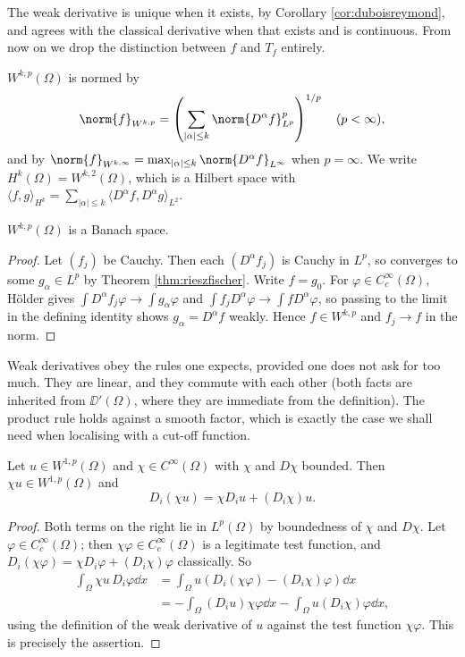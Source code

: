 \documentclass[a4paper]{scrartcl}
\newcommand{\ip}[2]{\langle #1, #2 \rangle}
\begin{document}
The weak derivative is unique when it exists, by Corollary \ref{cor:duboisreymond}, and agrees with the classical derivative when that exists and is continuous. From now on we drop the distinction between $f$ and $T_f$ entirely.

\begin{definition}
	$W^{k,p}(\Omega)$ is normed by
	$$\norm{f}_{W^{k,p}}=\left(\sum_{|\alpha|\le k}\norm{D^\alpha f}_{L^p}^p\right)^{1/p} \quad (p<\infty),$$
	and by $\norm{f}_{W^{k,\infty}}=\max_{|\alpha|\le k}\norm{D^\alpha f}_{L^\infty}$ when $p = \infty$.
	We write $H^k(\Omega)=W^{k,2}(\Omega)$, which is a Hilbert space with $\ip{f}{g}_{H^k}=\sum_{|\alpha|\le k}\ip{D^\alpha f}{D^\alpha g}_{L^2}$.
\end{definition}

\begin{proposition}
	$W^{k,p}(\Omega)$ is a Banach space.
\end{proposition}

\begin{proof}
	Let $(f_j)$ be Cauchy. Then each $(D^\alpha f_j)$ is Cauchy in $L^p$, so converges to some $g_\alpha \in L^p$ by Theorem \ref{thm:rieszfischer}. Write $f = g_0$. For $\varphi\in C_c^\infty(\Omega)$, H\"older gives $\int D^\alpha f_j\varphi\to\int g_\alpha\varphi$ and $\int f_jD^\alpha\varphi\to\int fD^\alpha\varphi$, so passing to the limit in the defining identity shows $g_\alpha = D^\alpha f$ weakly. Hence $f \in W^{k,p}$ and $f_j \to f$ in the norm.
\end{proof}

Weak derivatives obey the rules one expects, provided one does not ask for too much. They are linear, and they commute with each other (both facts are inherited from $\DD'(\Omega)$, where they are immediate from the definition). The product rule holds against a smooth factor, which is exactly the case we shall need when localising with a cut-off function.

\begin{lemma}\label{lem:leibniz}
	Let $u \in W^{1,p}(\Omega)$ and $\chi \in C^\infty(\Omega)$ with $\chi$ and $D\chi$ bounded. Then $\chi u \in W^{1,p}(\Omega)$ and
	$$D_i(\chi u) = \chi D_iu + (D_i\chi)u.$$
\end{lemma}

\begin{proof}
	Both terms on the right lie in $L^p(\Omega)$ by boundedness of $\chi$ and $D\chi$. Let $\varphi \in C_c^\infty(\Omega)$; then $\chi\varphi \in C_c^\infty(\Omega)$ is a legitimate test function, and $D_i(\chi\varphi)=\chi D_i\varphi+(D_i\chi)\varphi$ classically. So
	\begin{align*}
		\int_\Omega \chi u \, D_i\varphi \dd x &= \int_\Omega u\left( D_i(\chi\varphi)-(D_i\chi)\varphi\right)\dd x \\
		&= -\int_\Omega (D_iu)\chi\varphi\dd x - \int_\Omega u (D_i\chi)\varphi\dd x,
	\end{align*}
	using the definition of the weak derivative of $u$ against the test function $\chi\varphi$. This is precisely the assertion.
\end{proof}
\end{document}
